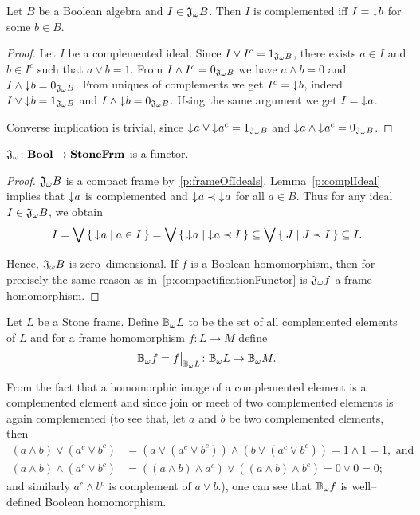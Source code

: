 \begin{lemma}\label{p:complIdeal}
    Let $B$ be a Boolean algebra and $I \in \mathfrak{J}_{\omega} B$. Then $I$ is complemented iff $I = \mathord{\downarrow}\mkern1mu b$ for some $b \in B$.
\end{lemma}
\begin{proof}
    Let $I$ be a complemented ideal. Since $I \vee I^c = 1_{\mathfrak{J}_{\omega} B}$, there exists $a \in I$ and $b \in I^c$ such that $a \vee b = 1$. From $I \wedge I^c = 0_{\mathfrak{J}_{\omega} B}$ we have $a \wedge b = 0$ and $I \wedge \mathord{\downarrow}\mkern1mu b = 0_{\mathfrak{J}_{\omega} B}$.
    From uniques of complements we get $I^c = \mathord{\downarrow}\mkern1mu b$, indeed $I \vee \mathord{\downarrow}\mkern1mu b = 1_{\mathfrak{J}_{\omega} B}$ and $I \wedge \mathord{\downarrow}\mkern1mu b = 0_{\mathfrak{J}_{\omega} B}$. Using the same argument we get $I = \mathord{\downarrow}\mkern1mu a$.

    Converse implication is trivial, since $\mathord{\downarrow}\mkern1mu a \vee \mathord{\downarrow}\mkern1mu a^c = 1_{\mathfrak{J}_{\omega} B}$ and $\mathord{\downarrow}\mkern1mu a \wedge \mathord{\downarrow}\mkern1mu a^c = 0_{\mathfrak{J}_{\omega} B}$.
\end{proof}

\begin{proposition}\label{p:JisFunctor}
    $\mathfrak{J}_{\omega}\colon \mathbf{Bool} \to \mathbf{StoneFrm}$ is a functor.
\end{proposition}
\begin{proof}
    $\mathfrak{J}_{\omega} B$ is a compact frame by~\ref{p:frameOfIdeals}. Lemma~\ref{p:complIdeal} implies that $\mathord{\downarrow}\mkern1mu a$ is complemented and $\mathord{\downarrow}\mkern1mu a \prec \mathord{\downarrow}\mkern1mu a$ for all $a \in B$. Thus for any ideal $I \in \mathfrak{J}_{\omega} B$, we obtain
    $$ I = \bigvee \Set{ \mathord{\downarrow}\mkern1mua | a \in I } = \bigvee \Set{ \mathord{\downarrow}\mkern1mua | \mathord{\downarrow}\mkern1mua \prec I } \subseteq \bigvee \Set{ J | J \prec I } \subseteq I.$$

\noindent Hence, $\mathfrak{J}_{\omega} B$ is zero--dimensional. If $f$ is a Boolean homomorphism, then for precisely the same reason as in~\ref{p:compactificationFunctor} is $\mathfrak{J}_{\omega} f$ a frame homomorphism.
\end{proof}

\begin{definition}
    Let $L$ be a Stone frame. Define $\DEFSYM{BcO}{$\BcO{}$} L$ to be the set of all complemented elements of $L$ and for a frame homomorphism $f\colon L \to M$ define
    $$\BcO f = \restr{f}{\BcO L}\colon \BcO L \to \BcO M.$$
\end{definition}

From the fact that a homomorphic image of a complemented element is a complemented element and since join or meet of two complemented elements is again complemented (to see that, let $a$ and $b$ be two complemented elements, then
    \begin{align*}
        (a\wedge b) \vee (a^c \vee b^c)
            &= (a\vee (a^c\vee b^c))\wedge (b\vee (a^c\vee b^c))
            = 1 \wedge 1 = 1, \text{ and} \\
        (a\wedge b) \wedge (a^c \vee b^c)
            &= ((a\wedge b)\wedge a^c)\vee ((a\wedge b)\wedge b^c)
            = 0 \vee 0 = 0;
    \end{align*}
and similarly $a^c\wedge b^c$ is complement of $a\vee b$.), one can see that $\mathbb{B}_{\omega} f$ is well--defined Boolean homomorphism.

